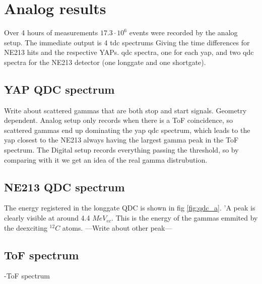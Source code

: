 \documentclass[main.tex]{subfiles}
\begin{document}
\section{Analog results}
Over 4 hours of measurements $17.3\cdot 10^{6}$ events were recorded by the analog setup. The immediate output is 4 tdc spectrums Giving the time differences for NE213 hits and the respective YAPs. qdc spectra, one for each yap, and two qdc spectra for the NE213 detector (one longgate and one shortgate). 
\subsection{YAP QDC spectrum}
Write about scattered gammas that are both stop and start signals. Geometry dependent. Analog setup only records when there is a ToF coincidence, so scattered gammas end up dominating the yap qdc spectrum, which leads to the yap closest to the NE213 always having the largest gamma peak in the ToF spectrum. The Digital setup records everything passing the threshold, so by comparing with it we get an idea of the real gamma distrubution.

\subsection{NE213 QDC spectrum}
The energy registered in the longgate QDC is shown in fig \ref{fig:qdc_a}. 'A peak is clearly visible at around 4.4 $MeV_{ec}$. This is the energy of the gammas emmited by the deexciting $^{12}C$ atoms. ---Write about other peak---

\subsection{ToF spectrum}
-ToF spectrum
\end{document}

